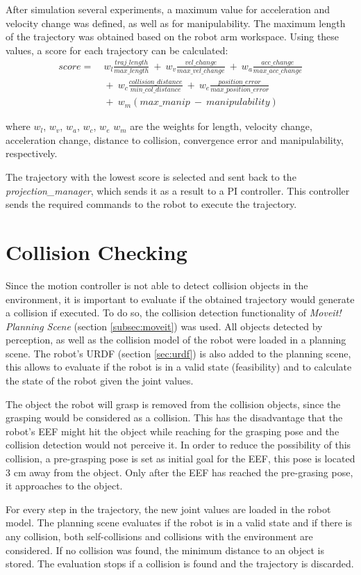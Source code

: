 After simulation several experiments, a maximum value for acceleration and velocity change was defined, as well as for manipulability. The maximum length of the trajectory was obtained based on the robot arm workspace. Using these values, a score for each trajectory can be calculated:
\begin{equation}
\begin{aligned}
score = &\ w_l\frac{traj\_length}{max\_length}\ +\ w_v\frac{vel\_change}{max\_vel\_change}\ +\ w_a\frac{acc\_change}{max\_acc\_change} \\
 & \ +\ w_c\frac{collision\_distance}{min\_col\_distance} 
\ +\ w_e\frac{position\_error}{max\_position\_error}\\
 & \ +\ w_m(max\_manip\ -\ manipulability)
\end{aligned}
\label{eq:score}
\end{equation}


where $w_l$, $w_v$, $w_a$, $w_c$, $w_e$ $w_m$ are the weights for length, velocity change, acceleration change, distance to collision, convergence error and manipulability, respectively.

The trajectory with the lowest score is selected and sent back to the \textit{projection\_manager}, which sends it as a result to a PI controller. This controller sends the required commands to the robot to execute the trajectory.


\section{Collision Checking}
Since the motion controller is not able to detect collision objects in the environment, it is important to evaluate if the obtained trajectory would generate a collision if executed. To do so, the collision detection functionality of \textit{Moveit! Planning Scene} (section \ref{subsec:moveit}) was used. All objects detected by perception, as well as the collision model of the robot were loaded in a planning scene. The robot's URDF (section \ref{sec:urdf}) is also added to the planning scene, this allows to evaluate if the robot is in a valid state (feasibility) and to calculate the state of the robot given the joint values.

The object the robot will grasp is removed from the collision objects, since the grasping would be considered as a collision. This has the disadvantage that the robot's EEF might hit the object while reaching for the grasping pose and the collision detection would not perceive it. In order to reduce the possibility of this collision, a pre-grasping pose is set as initial goal for the EEF, this pose is located 3 cm away from the object. Only after the EEF has reached the pre-grasing pose, it approaches to the object.

For every step in the trajectory, the new joint values are loaded in the robot model. The planning scene evaluates if the robot is in a valid state and if there is any collision, both self-collisions and collisions with the environment are considered. If no collision was found, the minimum distance to an object is stored. The evaluation stops if a collision is found and the trajectory is discarded.

